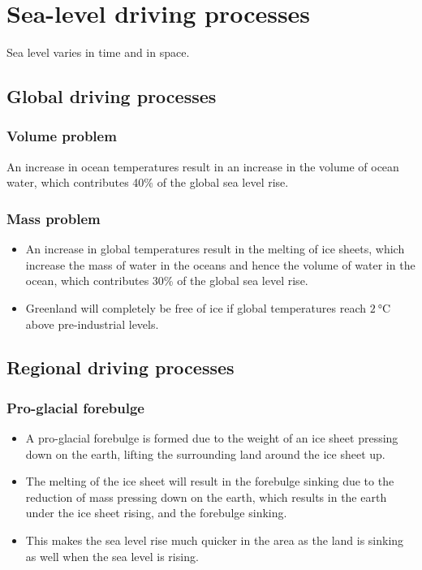 \documentclass[11pt]{article}
\begin{document}
\section{Sea-level driving processes}
\label{sec:org0b9b3c7}
Sea level varies in time and in space.

\subsection{Global driving processes}
\label{sec:org8624649}

\subsubsection{Volume problem}
\label{sec:org6842f48}
An increase in ocean temperatures result in an increase in the volume of ocean water, which contributes 40\% of the global sea level rise.

\subsubsection{Mass problem}
\label{sec:org91fc337}
\begin{itemize}
\item An increase in global temperatures result in the melting of ice sheets, which increase the mass of water in the oceans and hence the volume of water in the ocean, which contributes 30\% of the global sea level rise.
\item Greenland will completely be free of ice if global temperatures reach \(\qty{2}{\degreeCelsius}\) above pre-industrial levels.
\end{itemize}

\subsection{Regional driving processes}
\label{sec:orgfa13854}

\subsubsection{Pro-glacial forebulge}
\label{sec:org6dd47e8}
\begin{itemize}
\item A pro-glacial forebulge is formed due to the weight of an ice sheet pressing down on the earth, lifting the surrounding land around the ice sheet up.
\item The melting of the ice sheet will result in the forebulge sinking due to the reduction of mass pressing down on the earth, which results in the earth under the ice sheet rising, and the forebulge sinking.
\item This makes the sea level rise much quicker in the area as the land is sinking as well when the sea level is rising.
\end{itemize}
\end{document}
